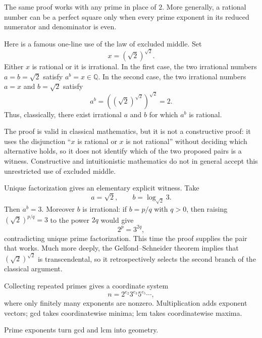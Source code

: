 The same proof works with any prime in place of $2$. More generally, a rational
number can be a perfect square only when every prime exponent in its reduced
numerator and denominator is even.

\begin{labbox}[title={Aside: existence without a witness}]
Here is a famous one-line use of the law of excluded middle. Set
\[
  x=(\sqrt2)^{\sqrt2}.
\]
Either $x$ is rational or it is irrational. In the first case, the two
irrational numbers $a=b=\sqrt2$ satisfy $a^b=x\in\mathbb Q$. In the second
case, the two irrational numbers $a=x$ and $b=\sqrt2$ satisfy
\[
  a^b=\left((\sqrt2)^{\sqrt2}\right)^{\sqrt2}=2.
\]
Thus, classically, there exist irrational $a$ and $b$ for which $a^b$ is
rational.

The proof is valid in classical mathematics, but it is not a constructive
proof: it uses the disjunction ``$x$ is rational or $x$ is not rational''
without deciding which alternative holds, so it does not identify which of
the two proposed pairs is a witness. Constructive and intuitionistic
mathematics do not in general accept this unrestricted use of excluded
middle.

Unique factorization gives an elementary explicit witness. Take
\[
  a=\sqrt2,
  \qquad
  b=\log_{\sqrt2}3.
\]
Then $a^b=3$. Moreover $b$ is irrational: if $b=p/q$ with $q>0$, then
raising $(\sqrt2)^{p/q}=3$ to the power $2q$ would give
\[
  2^p=3^{2q},
\]
contradicting unique prime factorization. This time the proof supplies the
pair that works. Much more deeply, the Gelfond--Schneider theorem implies that
$(\sqrt2)^{\sqrt2}$ is transcendental, so it retrospectively selects the
second branch of the classical argument.
\end{labbox}

Collecting repeated primes gives a coordinate system
\[
n=2^{e_2}3^{e_3}5^{e_5}\cdots,
\]
where only finitely many exponents are nonzero. Multiplication adds exponent vectors; gcd takes coordinatewise minima; lcm takes coordinatewise maxima.

\begin{center}

\small Prime exponents turn gcd and lcm into geometry.
\end{center}

